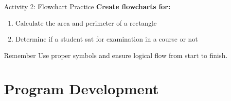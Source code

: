 \documentclass[aspectratio=169]{beamer}
\begin{document}
\begin{frame}{Activity 2: Flowchart Practice}
    \textbf{Create flowcharts for:}
    
    \begin{enumerate}
        \item Calculate the area and perimeter of a rectangle
        \item Determine if a student sat for examination in a course or not
    \end{enumerate}
    
    \vspace{0.5cm}
    \begin{block}{Remember}
        Use proper symbols and ensure logical flow from start to finish.
    \end{block}
\end{frame}

\section{Program Development}
\end{document}

